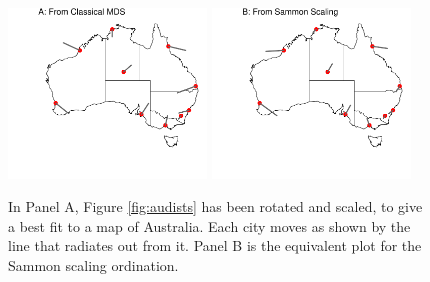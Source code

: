 \documentclass[12pt, a4paper,  BCOR=8.25mm, DIV=15]{scrartcl}\usepackage[]{graphicx}\usepackage[]{color}
\newenvironment{knitrout}{}{} %
\begin{document}
\begin{figure}[h]
\begin{knitrout}
\color{fgcolor}

{\centering \includegraphics[width=0.47\textwidth]{figs/xmeth-au-both-12_17-1} 
\includegraphics[width=0.47\textwidth]{figs/xmeth-au-both-12_17-2} 

}



\end{knitrout}
      \caption{In Panel A, Figure \ref{fig:audists} has been rotated and
        scaled, to give a best fit to a map of Australia.  Each city
        moves as shown by the line that radiates out from it.  Panel B
        is the equivalent plot for the Sammon scaling ordination.
\label{fig:aufit}}
\end{figure}
\end{document}
